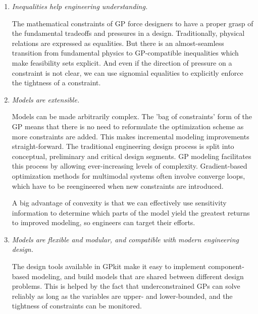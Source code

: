 \begin{enumerate}

    \item \textit{Inequalities help engineering understanding.}

The mathematical constraints of \gls{GP} force designers to have a proper grasp
of the fundamental tradeoffs and pressures in a design.
    Traditionally, physical relations are expressed as equalities. But there is an
almost-seamless transition from fundamental physics to GP-compatible
inequalities which make feasibility sets explicit.
And even if the direction of pressure on a constraint is not clear,
we can use signomial equalities to explicitly enforce the tightness of a
    constraint.

    \item \textit{Models are extensible.}
    
Models can be made arbitrarily complex. The 'bag of constraints' form of the GP
means that there is no need to reformulate the optimization scheme as more
constraints are added. This makes incremental modeling improvements straight-forward.
The traditional engineering design process is split into conceptual, preliminary
and critical design segments. GP modeling facilitates this process by allowing
ever-increasing levels of complexity. Gradient-based optimization methods for
multimodal systems often involve
converge loops, which have to be reengineered when new constraints are
introduced.



A big advantage of convexity is that we can effectively use sensitivity information
to determine which parts of the
model yield the greatest returns to improved modeling, so engineers can target
their efforts.

    \item \textit{Models are flexible and modular, and compatible with modern
    engineering design.}

The design tools available in GPkit make it easy to
implement component-based modeling, and build models that are shared between
different design problems.
This is helped by the fact that underconstrained \gls{GP}s can solve reliably as long as
    the variables are upper- and lower-bounded,
and the tightness of constraints can be monitored.

\end{enumerate}

